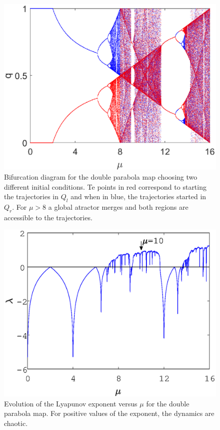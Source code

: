\begin{figure}
	\centering
	\includegraphics[width=1\linewidth]{Images/P1/Alt_Bifurcation.eps}
	\caption{Bifurcation diagram for the double parabola map choosing two different initial conditions. Te points in red correspond to starting the trajectories in $Q_l$ and when in blue, the trajectories started in $Q_r$. For $\mu>8$ a global atractor merges and both regions are accessible to the trajectories.} 
	\label{fig:Alt_Bifurcation}
\end{figure}


\begin{figure}
	\centering
	\includegraphics[width=1\linewidth]{Images/P1/Alt_Lyapunov.eps}
	\caption{Evolution of the Lyapunov exponent versus $\mu$ for the double parabola map. For positive values of the exponent, the dynamics are chaotic.}
	\label{fig:Alt_Lyapunov}
\end{figure}




